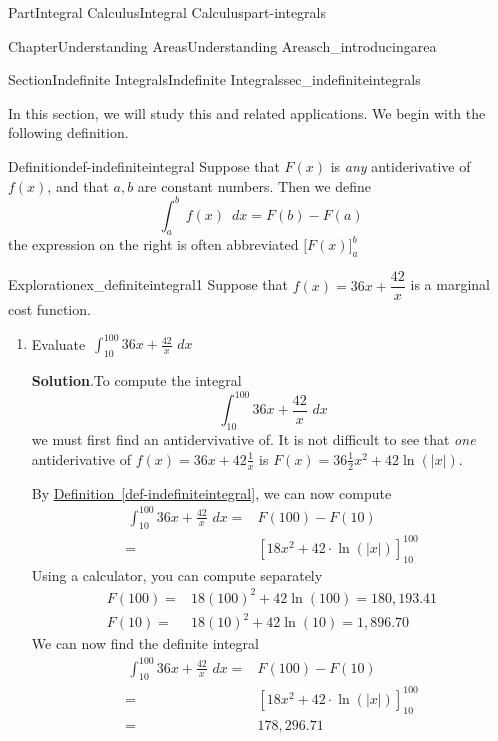 \documentclass{tufte-book}
\newcommand{\blocktitlefont}{\relax}
\newcommand{\xreffont}{\relax}
\numberwithin{equation}{chapter}
\newcommand{\intdx}[1]{{\,\int#1\,\,dx}}
\newcommand{\amp}{&}
\begin{document}
\begin{partptx}{Part}{Integral Calculus}{}{Integral Calculus}{}{}{part-integrals}
\begin{chapterptx}{Chapter}{Understanding Areas}{}{Understanding Areas}{}{}{ch_introducingarea}
\begin{sectionptx}{Section}{Indefinite Integrals}{}{Indefinite Integrals}{}{}{sec_indefiniteintegrals}
\par
In this section, we will study this and related applications. We begin with the following definition.%
\begin{definition}{Definition}{}{def-indefiniteintegral}%
Suppose that \(F(x)\) is \emph{any} antiderivative of \(f(x)\), and that \(a,b\) are constant numbers. Then we define%
\begin{equation*}
\intdx{_a^b \, f(x)\, } = F(b) - F(a) 
\end{equation*}
the expression on the right is often abbreviated \(\Big[F(x)\Big]_a^b\)%
\end{definition}
\begin{exploration}{Exploration}{}{ex_definiteintegral1}%
Suppose that \(f(x) = 36x + \dfrac{42}{x}\) is a marginal cost function.%
\begin{enumerate}[font=\bfseries,label=(\alph*),ref=\alph*]%
\item{}Evaluate \(\displaystyle\intdx{_{10}^{100} 36x + \frac{42}{x}}\)%
\par\smallskip%
\noindent\textbf{\blocktitlefont Solution}.\hypertarget{ex_definiteintegral1-2-2}{}\quad{}To compute the integral%
\begin{equation*}
\intdx{_{10}^{100} 36x + \frac{42}{x}} 
\end{equation*}
we must first find an antidervivative of.  It is not difficult to see that \emph{one} antiderivative of \(f(x) = 36x + 42\frac{1}{x}\) is \(F(x) = 36\frac{1}{2}x^2 + 42\ln(|x|)\).%
\par
By \hyperref[def-indefiniteintegral]{Definition~{\xreffont\ref{def-indefiniteintegral}}}, we can now compute%
\begin{align*}
\intdx{_{10}^{100} 36x + \frac{42}{x}}  = \amp F(100) - F(10) \\
= \amp [18x^2 + 42\cdot \ln(|x|)]_{10}^{100}
\end{align*}
Using a calculator, you can compute separately%
\begin{align*}
F(100) = \amp 18 (100)^2 + 42\ln(100) = 180,193.41\\
F(10) = \amp 18 (10)^2 + 42\ln(10) = 1,896.70
\end{align*}
We can now find the definite integral%
\begin{align*}
\intdx{_{10}^{100} 36x + \frac{42}{x}}  = \amp F(100) - F(10) \\
= \amp [18x^2 + 42\cdot \ln(|x|)]_{10}^{100}\\
= \amp 178,296.71 
\end{align*}

\end{enumerate}
\end{exploration}
\end{sectionptx}
\end{chapterptx}
\end{partptx}
\end{document}
